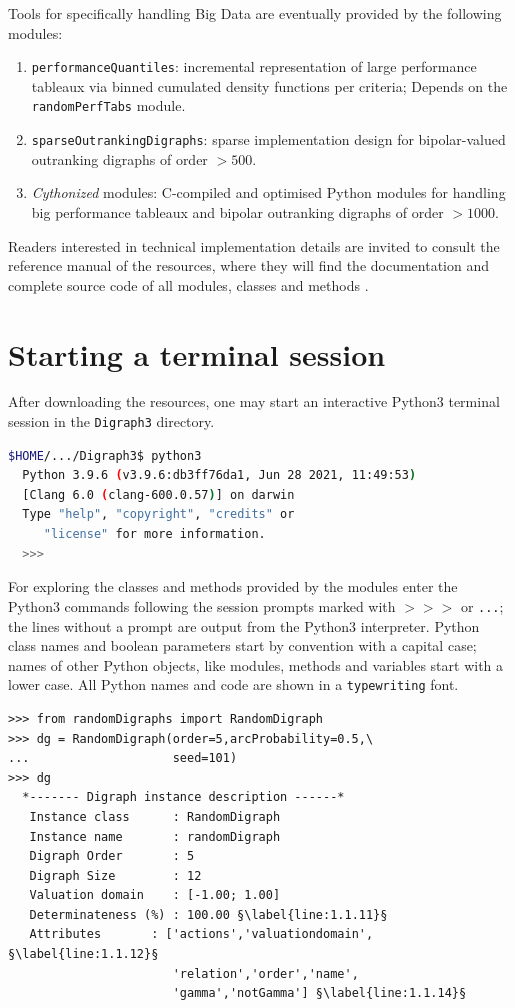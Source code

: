 \noindent Tools for specifically handling Big Data are eventually provided by the following modules:
\begin{enumerate}[leftmargin=0.75cm]
\item \texttt{performanceQuantiles}: incremental representation of large performance tableaux via binned cumulated density functions per criteria; Depends on the \texttt{randomPerfTabs} module.
\item \texttt{sparseOutrankingDigraphs}: sparse implementation design for bipolar-valued outranking digraphs of order $> 500$.
\item \emph{Cythonized} modules: C-compiled and optimised Python modules for handling big performance tableaux and bipolar outranking digraphs of order $> 1000$.
\end{enumerate}

Readers interested in technical implementation details are invited to consult the reference manual of the \Digraph resources, where they will find the documentation and complete source code of all \Digraph modules, classes and methods \citep{BIS-2021b}. 

\section{Starting a \Digraph terminal session}
\label{sec:1.3}
After downloading the \Digraph resources, one may start an interactive Python3 terminal session in the \texttt{Digraph3} directory.
\begin{lstlisting}[language=sh, backgroundcolor=\color{White}, numbers=none]
  $HOME/.../Digraph3$ python3
  Python 3.9.6 (v3.9.6:db3ff76da1, Jun 28 2021, 11:49:53) 
  [Clang 6.0 (clang-600.0.57)] on darwin
  Type "help", "copyright", "credits" or 
     "license" for more information.
  >>>
\end{lstlisting}

For exploring the classes and methods provided by the \Digraph modules enter the Python3 commands following the session prompts marked with $>>>$ or \texttt{...}; the lines without a prompt are output from the Python3 interpreter. Python class names and boolean parameters start by convention with a capital case; names of other Python objects, like modules, methods and variables start with a lower case. All Python names and code are shown in a \texttt{typewriting} font.
\begin{lstlisting}[caption={Generating a digraph instance},label=list:1.1]
>>> from randomDigraphs import RandomDigraph
>>> dg = RandomDigraph(order=5,arcProbability=0.5,\
...                    seed=101)
>>> dg
  *------- Digraph instance description ------*
   Instance class      : RandomDigraph
   Instance name       : randomDigraph
   Digraph Order       : 5
   Digraph Size        : 12
   Valuation domain    : [-1.00; 1.00]
   Determinateness (%) : 100.00 §\label{line:1.1.11}§
   Attributes       : ['actions','valuationdomain', §\label{line:1.1.12}§
                       'relation','order','name',
                       'gamma','notGamma'] §\label{line:1.1.14}§
\end{lstlisting}

